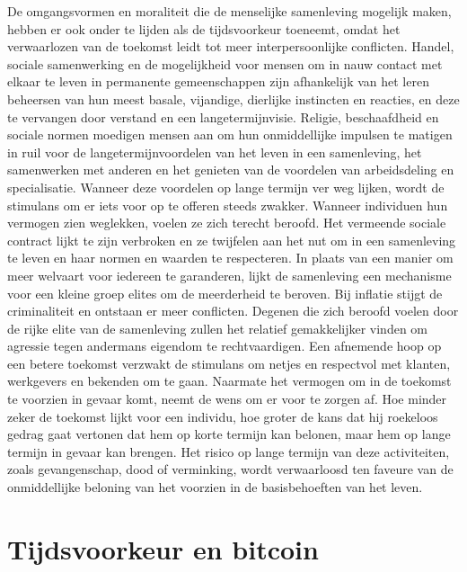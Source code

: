 De omgangsvormen en moraliteit die de menselijke samenleving mogelijk maken, hebben er ook onder te lijden als de tijdsvoorkeur toeneemt, omdat het verwaarlozen van de toekomst leidt tot meer interpersoonlijke conflicten. Handel, sociale samenwerking en de mogelijkheid voor mensen om in nauw contact met elkaar te leven in permanente gemeenschappen zijn afhankelijk van het leren beheersen van hun meest basale, vijandige, dierlijke instincten en reacties, en deze te vervangen door verstand en een langetermijnvisie. Religie, beschaafdheid en sociale normen moedigen mensen aan om hun onmiddellijke impulsen te matigen in ruil voor de langetermijnvoordelen van het leven in een samenleving, het samenwerken met anderen en het genieten van de voordelen van arbeidsdeling en specialisatie. Wanneer deze voordelen op lange termijn ver weg lijken, wordt de stimulans om er iets voor op te offeren steeds zwakker. Wanneer individuen hun vermogen zien weglekken, voelen ze zich terecht beroofd. Het vermeende sociale contract lijkt te zijn verbroken en ze twijfelen aan het nut om in een samenleving te leven en haar normen en waarden te respecteren. In plaats van een manier om meer welvaart voor iedereen te garanderen, lijkt de samenleving een mechanisme voor een kleine groep elites om de meerderheid te beroven. Bij inflatie stijgt de criminaliteit en ontstaan er meer conflicten.\autocite{153} Degenen die zich beroofd voelen door de rijke elite van de samenleving zullen het relatief gemakkelijker vinden om agressie tegen andermans eigendom te rechtvaardigen. Een afnemende hoop op een betere toekomst verzwakt de stimulans om netjes en respectvol met klanten, werkgevers en bekenden om te gaan. Naarmate het vermogen om in de toekomst te voorzien in gevaar komt, neemt de wens om er voor te zorgen af. Hoe minder zeker de toekomst lijkt voor een individu, hoe groter de kans dat hij roekeloos gedrag gaat vertonen dat hem op korte termijn kan belonen, maar hem op lange termijn in gevaar kan brengen. Het risico op lange termijn van deze activiteiten, zoals gevangenschap, dood of verminking, wordt verwaarloosd ten faveure van de onmiddellijke beloning van het voorzien in de basisbehoeften van het leven.\autocite{154}

\hypertarget{tijdsvoorkeur-en-bitcoin}{%
\section{Tijdsvoorkeur en bitcoin}\label{tijdsvoorkeur-en-bitcoin}}

